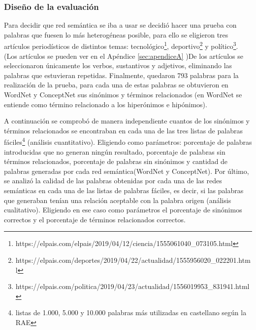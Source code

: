 \subsubsection{Diseño de la evaluación}
\label{cap:subsec:disenioeval}


Para decidir que red semántica se iba a usar se decidió hacer una prueba con palabras que fuesen lo más heterogéneas posible, para ello se eligieron tres artículos periodísticos de distintos temas: tecnológico\footnote{https://elpais.com/elpais/2019/04/12/ciencia/1555061040\_073105.html}, deportivo\footnote{https://elpais.com/deportes/2019/04/22/actualidad/1555956020\_022201.html} y político\footnote{https://elpais.com/politica/2019/04/23/actualidad/1556019953\_831941.html}. (Los artículos se pueden ver en el Apéndice \ref{sec:apendiceA} )De los artículos se seleccionaron únicamente los verbos, sustantivos y adjetivos, eliminando las palabras que estuvieran repetidas. Finalmente, quedaron 793 palabras para la realización de la prueba, para cada una de estas palabras se obtuvieron en WordNet y ConceptNet sus sinónimos y términos relacionados (en WordNet se entiende como término relacionado a los hiperónimos e hipónimos).

A continuación se comprobó de manera independiente cuantos de los sinónimos y términos relacionados se encontraban en cada una de las tres listas de palabras fáciles\footnote{listas de 1.000, 5.000 y 10.000 palabras más utilizadas en castellano según la RAE} (análisis cuantitativo). Eligiendo como parámetros: porcentaje de palabras introducidas que no generan ningún resultado, porcentaje de palabras sin términos relacionados, porcentaje de palabras sin sinónimos  y cantidad de palabras generadas por cada red semántica(WordNet y ConceptNet). Por último, se analizó la calidad de las palabras obtenidas por cada una de las redes semánticas en cada una de las listas de palabras fáciles, es decir, si las palabras que generaban tenían una relación aceptable con la palabra origen (análisis cualitativo). Eligiendo en ese caso como parámetros el porcentaje de sinónimos correctos y el porcentaje de términos relacionados correctos.

